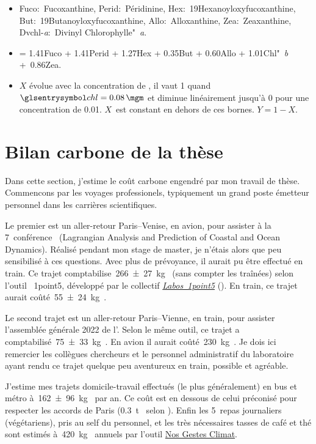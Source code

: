 {
\small
\begin{itemize}
  \item Fuco:~Fucoxanthine, Perid:~Péridinine, Hex:~19Hexanoyloxyfucoxanthine, But:~19Butanoyloxyfucoxanthine, Allo:~Alloxanthine, Zea:~Zeaxanthine, \hbox{Dvchl-\textit{a}}:~Divinyl Chlorophylle"~\textit{a}.
  \item \sumdp{} = 1.41Fuco + 1.41Perid + 1.27Hex + 0.35But + 0.60Allo + 1.01Chl"~\textit{b} +~0.86Zea.
  \item \(X\) évolue avec la concentration de , il vaut 1 quand \(\am{chl}=\qty{0.08}{\mgm}\) et diminue linéairement jusqu'à 0 pour une concentration de \qty{0.01}{\mgm}. \(X\)~est constant en dehors de ces bornes. \(Y = 1-X\).
\end{itemize}
}

\chapter{Bilan carbone de la thèse}
\label{ax:bilan-carbone}

Dans cette section, j'estime le coût carbone engendré par mon travail de thèse.
Commencons par les voyages professionels, typiquement un grand poste émetteur personnel dans les carrières scientifiques.

Le premier est un aller-retour Paris--Venise, en avion, pour assister à la 7\ieme~conférence ~(Lagrangian Analysis and Prediction of Coastal and Ocean Dynamics).
Réalisé pendant mon stage de master, je n'étais alors que peu sensibilisé à ces questions. Avec plus de prévoyance, il aurait pu être effectué en train.
Ce trajet comptabilise~\qty{266 \pm 27}{\kg\carbone} (sans compter les traînées) selon l'outil ~1point5, développé par le collectif \href{https://labos1point5.org/}{\textit{Labos~1point5}} (\cite{mariette_2022}).
En train, ce trajet aurait coûté~\qty{55 \pm 24}{\kg\carbone}.

Le second trajet est un aller-retour Paris--Vienne, en train, pour assister l'assemblée générale 2022 de l'.
Selon le même outil, ce trajet a comptabilisé~\qty{75 \pm 33}{\kg\carbone}.
En avion il aurait coûté~\qty{230}{\kg\carbone}.
Je dois ici remercier les collègues chercheurs et le personnel administratif du laboratoire ayant rendu ce trajet quelque peu aventureux en train, possible et agréable.

J'estime  mes trajets domicile-travail effectués (le plus généralement) en bus et métro à~\qty{162 \pm 96}{\kg\carbone} par an.
Ce coût est en dessous de celui préconisé pour respecter les accords de Paris (\qty{0.3}{\tonne\carbone} selon \cite{dugast_2019}).
Enfin les 5~repas journaliers (végétariens), pris au self du personnel, et les très nécessaires tasses de café et thé sont estimés à~\qty{420}{\kg\carbone} annuels par l'outil \href{https://nosgestesclimat.fr}{Nos Gestes Climat}.

